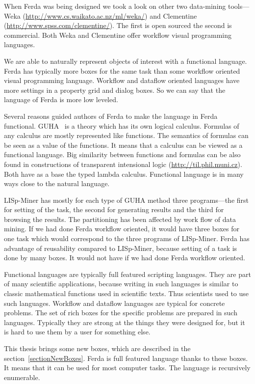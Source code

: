 \documentclass[a4paper,12pt]{book}
\begin{document}
When Ferda was being designed we took a look on other two data-mining tools---Weka (\url{http://www.cs.waikato.ac.nz/ml/weka/}) and Clementine (\url{http://www.spss.com/clementine/}). The first is open sourced the second is commercial. Both Weka and Clementine offer workflow visual programming languages.

We are able to naturally represent objects of interest with a functional language. Ferda has typically more boxes for the same task than some workflow oriented visual programming language. Workflow and dataflow oriented languages have more settings in a property grid and dialog boxes. So we can say that the language of Ferda is more low leveled.

Several reasons guided authors of Ferda to make the language in Ferda functional. GUHA~\cite{GUHAbook} is a theory which has its own logical calculus. Formulas of any calculus are mostly represented like functions. The semantics of formulas can be seen as a value of the functions. It means that a calculus can be viewed as a functional language. Big similarity between functions and formulas can be also found in constructions of transparent intensional logic (\url{http://til.phil.muni.cz}). Both have as a base the typed lambda calculus. Functional language is in many ways close to the natural language. 

LISp-Miner has mostly for each type of GUHA method three programs---the first for setting of the task, the second for generating results and the third for browsing the results. The partitioning has been affected by work flow of data mining. If we had done Ferda workflow oriented, it would have three boxes for one task which would correspond to the three programs of LISp-Miner. Ferda has advantage of reusability compared to LISp-Miner, because setting of a task is done by many boxes. It would not have if we had done Ferda workflow oriented. 

Functional languages are typically full featured scripting languages. They are part of many scientific applications, because writing in such languages is similar to classic mathematical functions used in scientific texts. Thus scientists used to use such languages. Workflow and dataflow languages are typical for concrete problems. The set of rich boxes for the specific problems are prepared in such languages. Typically they are strong at the things they were designed for, but it is hard to use them by a user for something else.

This thesis brings some new boxes, which are described in the section~\ref{sectionNewBoxes}. Ferda is full featured language thanks to these boxes. It means that it can be used for most computer tasks. The language is recursively enumerable.
\end{document}
